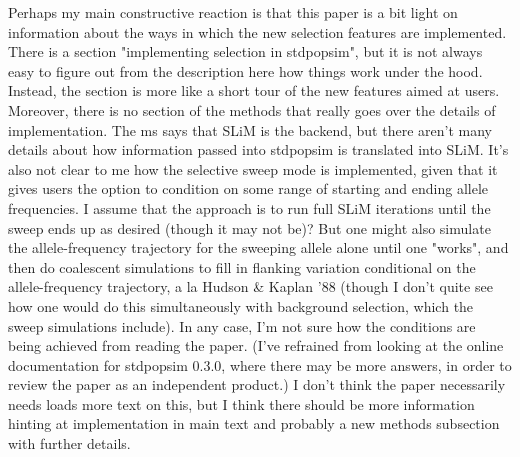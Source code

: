   \begin{point}{}
    Perhaps my main constructive reaction is that this paper is a bit light on information about the ways in which the new selection features are implemented. 
    There is a section "implementing selection in stdpopsim", but it is not always easy to figure out from the description here how things work under the hood. 
    Instead, the section is more like a short tour of the new features aimed at users. 
    Moreover, there is no section of the methods that really goes over the details of implementation. 
    The ms says that SLiM is the backend, but there aren't many details about how information passed into stdpopsim is translated into SLiM. 
    It's also not clear to me how the selective sweep mode is implemented, given that it gives users the option to condition on some range of starting and ending allele frequencies. 
    I assume that the approach is to run full SLiM iterations until the sweep ends up as desired (though it may not be)? 
    But one might also simulate the allele-frequency trajectory for the sweeping allele alone until one "works", 
    and then do coalescent simulations to fill in flanking variation conditional on the allele-frequency trajectory, 
    a la Hudson \& Kaplan '88 (though I don't quite see how one would do this simultaneously with background selection, 
    which the sweep simulations include). In any case, I'm not sure how the conditions are being achieved from reading the paper. 
    (I've refrained from looking at the online documentation for stdpopsim 0.3.0, where there may be more answers, in order to review the paper as an independent product.) 
    I don't think the paper necessarily needs loads more text on this, but I think there should be more information hinting at implementation in main text and probably a new methods subsection with further details.  
\end{point}
  
  
